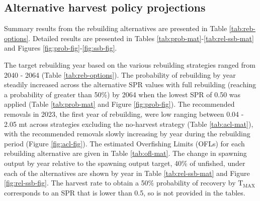 \documentclass[11pt,
  english,
  a4paper,
]{article}
\begin{document}
\leavevmode\tagmcend\tagstructend\par


\hypertarget{alternative-harvest-policy-projections}{%
\subsection{Alternative harvest policy projections}\label{alternative-harvest-policy-projections}}

\leavevmode\tagmcend\tagstructend


Summary results from the rebuilding alternatives are presented in Table \ref{tab:reb-options}. Detailed results are presented in Tables \ref{tab:prob-mat}-\ref{tab:rel-ssb-mat} and Figures \ref{fig:prob-fig}-\ref{fig:ssb-fig}.

\leavevmode\tagmcend\tagstructend\par


The target rebuilding year based on the various rebuilding strategies ranged from 2040 - 2064 (Table \ref{tab:reb-options}). The probability of rebuilding by year steadily increased across the alternative SPR values with full rebuilding (reaching a probability of greater than 50\%) by 2064 when the lowest SPR of 0.50 was applied (Table \ref{tab:prob-mat} and Figure \ref{fig:prob-fig}). The recommended removals in 2023, the first year of rebuilding, were low ranging between 0.04 - 2.05 mt across strategies excluding the no-harvest strategy (Table \ref{tab:acl-mat}), with the recommended removals slowly increasing by year during the rebuilding period (Figure \ref{fig:acl-fig}). The estimated Overfishing Limits (OFLs) for each rebuilding alternative are given in Table \ref{tab:ofl-mat}. The change in spawning output by year relative to the spawning output target, 40\% of unfished, under each of the alternatives are shown by year in Table \ref{tab:rel-ssb-mat} and Figure \ref{fig:rel-ssb-fig}. The harvest rate to obtain a 50\% probability of recovery by {\(\text{T}_\text{MAX}\)\leavevmode\tagmcend\tagstructend} corresponds to an SPR that is lower than 0.5, so is not provided in the tables.

\leavevmode\tagmcend\tagstructend\par
\end{document}
